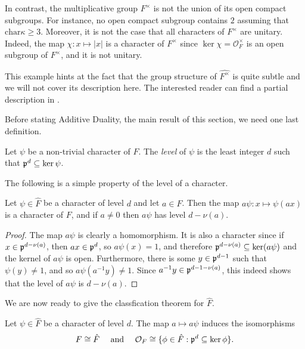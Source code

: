 \begin{example}
    In contrast, the multiplicative group $F^\times$ is not the union of its open compact subgroups. For instance, no open compact subgroup contains $2$ assuming that $\mathrm{char}\kappa\geq 3$. Moreover, it is not the case that all characters of $F^\times$ are unitary. Indeed, the map $\chi:x\mapsto|x|$ is a character of $F^{\times}$ since $\ker\chi=\mathcal{O}_F^\times$ is an open subgroup of $F^\times$, and it is not unitary.

    This example hints at the fact that the group structure of $\hat{F^\times}$ is quite subtle and we will not cover its description here. The interested reader can find a partial description in \cite[\S 1.8]{BH1}.
\end{example}


Before stating Additive Duality, the main result of this section, we need one last definition.

\begin{defn}\label{def:addlevel}
    Let $\psi$ be a non-trivial character of $F$. The \textit{level} of $\psi$ is the least integer $d$ such that $\mathfrak{p}^d\subseteq\ker\psi$.
\end{defn}

The following is a simple property of the level of a character.

\begin{lemma}
    Let $\psi\in\hat{F}$ be a character of level $d$ and let $a\in F$. Then the map $a\psi:x\mapsto\psi(ax)$ is a character of $F$, and if $a\neq0$ then $a\psi$ has level $d-\nu(a)$.
\end{lemma}
\begin{proof}
    The map $a\psi$ is clearly a homomorphism. It is also a character since if $x\in\mathfrak{p}^{d-\nu(a)}$, then $ax\in\mathfrak{p}^d$, so $a\psi(x)=1$, and therefore $\mathfrak{p}^{d-\nu(a)}\subseteq\ker(a\psi)$ and the kernel of $a\psi$ is open. Furthermore, there is some $y\in\mathfrak{p}^{d-1}$ such that $\psi(y)\neq1$, and so $a\psi(a^{-1}y)\neq1$. Since $a^{-1}y\in\mathfrak{p}^{d-1-\nu(a)}$, this indeed shows that the level of $a\psi$ is $d-\nu(a)$. 
\end{proof}

We are now ready to give the classfication theorem for $\hat{F}$.

\begin{thm}\label{add_dual}
    Let $\psi\in\hat{F}$ be a character of level $d$. The map $a\mapsto a\psi$ induces the isomorphisms 
    $$F\cong\hat{F} \quad\text{ and }\quad \mathcal{O}_F\cong\{\phi\in\hat{F}:\mathfrak{p}^d\subseteq\ker\phi\}.$$  
\end{thm}

